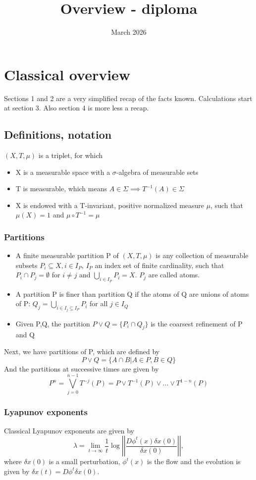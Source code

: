 \documentclass{article}
\title{Overview - diploma}
\date{March 2026}
\newcommand{\x}{$(X,T,\mu) $ }
\begin{document}
\tableofcontents
\section{Classical overview}
Sections 1 and 2 are a very simplified recap of the facts known. Calculations start at section 3. Also section 4 is more less a recap. 
\subsection{Definitions, notation}
\x is a triplet, for which

\begin{itemize}
    \item X is a measurable space with a $\sigma$-algebra of measurable sets 
    \item T is measurable, which means $A\in\Sigma \implies T^{-1}(A)\in \Sigma$ 
    \item X is endowed with a T-invariant, positive normalized measure $\mu$, such that $\mu(X) = 1$ and $\mu\circ T^{-1} = \mu$
\end{itemize}
\subsubsection{Partitions}
\begin{itemize}
    \item A finite measurable partition P of \x is any collection of measurable subsets $P_i\subseteq X, i\in I_P$, $I_P$ an index set of finite cardinality, such that $P_i\cap P_j = \emptyset$ for $i\neq j$ and $\bigcup_{i\in I_P}P_i = X$. $P_j$ are called atoms. 
    \item A partition P is finer than partition Q if the atoms of Q are unions of atoms of P: $Q_j = \bigcup_{i\in I_j\subseteq I_P}P_i $ for all $j\in I_Q$
    \item Given P,Q, the partition $P\vee Q = \{P_i \cap Q_j\}$ is the coarsest refinement of P and Q
\end{itemize}

Next, we have partitions of P, which are defined by
\begin{equation}
    P\vee Q = \{A\cap B| A\in P , B\in Q\}
\end{equation}
And the partitions at successive times are given by
\begin{equation}
    P^{n} = \bigvee_{j=0}^{n-1}T^{-j}(P) = P\vee T^{-1}(P)\vee...\vee T^{1-n}(P)
\end{equation}
\subsubsection{Lyapunov exponents}
Classical Lyapunov exponents are given by
\begin{equation}
    \lambda = \lim_{t\to \infty}\frac{1}{t}\log{\left|\left|\frac{D\phi^t(x)\delta x(0)}{\delta x(0)}\right|\right|},
\end{equation}
where $\delta x(0)$ is a small perturbation, $\phi^t(x)$ is the flow and the evolution is given by $\delta x(t)=  D\phi^t\delta x(0)$. \\
\end{document}
